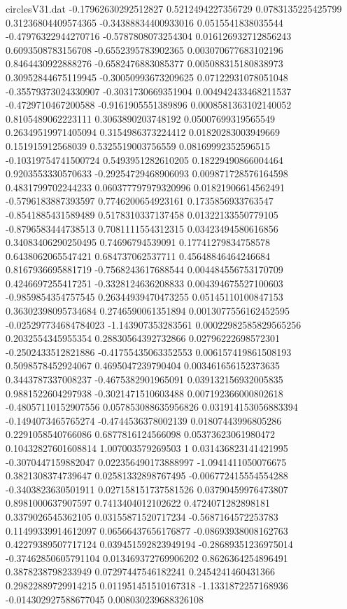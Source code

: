 \begin{filecontents}{circlesV31.dat}
-0.17962630292512827	0.5212494227356729	0.0783135225425799
0.31236804409574365	-0.34388834400933016	0.0515541838035544
-0.47976322944270716	-0.5787808073254304	0.016126932712856243
0.6093508783156708	-0.6552395783902365	0.003070677683102196
0.8464430922888276	-0.6582476883085377	0.005088315180838973
0.30952844675119945	-0.30050993673209625	0.07122931078051048
-0.35579373024330907	-0.3031730669351904	0.004942433468211537
-0.4729710467200588	-0.9161905551389896	0.0008581363102140052
0.8105489062223111	0.3063890203748192	0.05007699319565549
0.26349519971405094	0.3154986373224412	0.01820283003949669
0.151915912568039	0.5325519003756559	0.08169992352596515
-0.10319754741500724	0.5493951282610205	0.18229490866004464
0.9203553330570633	-0.29254729468906093	0.009871728576164598
0.4831799702244233	0.060377797979320996	0.01821906614562491
-0.5796183887393597	0.7746200654923161	0.1735856933763547
-0.8541885431589489	0.5178310337137458	0.01322133550779105
-0.8796583444738513	0.7081111554312315	0.03423494580616856
0.34083406290250495	0.74696794539091	0.17741279834758578
0.6438062065547421	0.684737062537711	0.45648846464246684
0.8167936695881719	-0.7568243617688544	0.004484556753170709
0.4246697255417251	-0.3328124636208833	0.004394675527100603
-0.9859854354757545	0.26344939470473255	0.05145110100847153
0.36302398095734684	0.2746590061351894	0.0013077556162452595
-0.025297734684784023	-1.143907353283561	0.00022982585829565256
0.2032554345955354	0.28830564392732866	0.02796222698572301
-0.2502433512821886	-0.41755435063352553	0.006157419861508193
0.5098578452924067	0.4695047239790404	0.003461656152373635
0.3443787337008237	-0.4675382901965091	0.039132156932005835
0.9881522604297938	-0.3021471510603488	0.007192366000802618
-0.48057110152907556	0.057853088635956826	0.031914153056883394
-0.1494073465765274	-0.4744536378002139	0.01807443996805286
0.2291058540766086	0.6877816124566098	0.05373623061980472
0.10432827601608814	1.007003579269503	1
0.031436823141421995	-0.3070447159882047	0.022356490173888997
-1.0941411050076675	0.3821308374739647	0.02581332898767495
-0.006772415554554288	-0.3403823630501911	0.027158151737581526
0.03790459976473807	0.8981000637907597	0.7413404012102622
0.4724071282898181	0.3379026545362105	0.03155871520717234
-0.5687164572253783	0.11499339914612097	0.06566437656176877
-0.08693938008162763	0.42279389507717124	0.039451592823949194
-0.28689351236975014	-0.37462850605791104	0.013469372769906202
0.8626364254896491	0.3878238798233949	0.07297447546182241
0.2454241460431366	0.29822889729914215	0.011951451510167318
-1.1331872257168936	-0.014302927588677045	0.008030239688326108

\end{filecontents}
